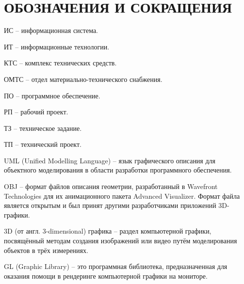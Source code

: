 \section*{ОБОЗНАЧЕНИЯ И СОКРАЩЕНИЯ}

ИС -- информационная система.

ИТ -- информационные технологии. 

КТС -- комплекс технических средств.

ОМТС -- отдел материально-технического снабжения. 

ПО -- программное обеспечение.

РП -- рабочий проект.

ТЗ -- техническое задание.

ТП -- технический проект.

UML (Unified Modelling Language) -- язык графического описания для объектного моделирования в области разработки программного обеспечения.

OBJ -- формат файлов описания геометрии, разработанный в Wavefront Technologies для их анимационного пакета Advanced Visualizer. Формат файла является открытым и был принят другими разработчиками приложений 3D-графики.

3D (от англ. 3-dimensional) графика -- раздел компьютерной графики, посвящённый методам создания изображений или видео путём моделирования объектов в трёх измерениях.

GL (Graphic Library) -- это программная библиотека, предназначенная для оказания помощи в рендеринге компьютерной графики на мониторе.